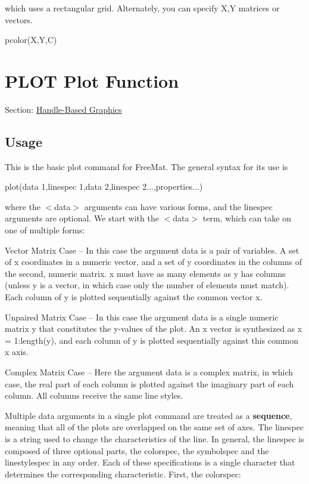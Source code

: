  which uses a rectangular grid. Alternately, you can specify {\ttfamily X,Y} matrices or vectors. \begin{DoxyVerb}   pcolor(X,Y,C)
\end{DoxyVerb}
 \hypertarget{handle_plot}{}\section{P\-L\-O\-T Plot Function}\label{handle_plot}
Section\-: \hyperlink{sec_handle}{Handle-\/\-Based Graphics} \hypertarget{vtkwidgets_vtkxyplotwidget_Usage}{}\subsection{Usage}\label{vtkwidgets_vtkxyplotwidget_Usage}
This is the basic plot command for Free\-Mat. The general syntax for its use is \begin{DoxyVerb}  plot(\<data 1\>,{linespec 1},\<data 2\>,{linespec 2}...,properties...)
\end{DoxyVerb}
 where the {\ttfamily $<$data$>$} arguments can have various forms, and the {\ttfamily linespec} arguments are optional. We start with the {\ttfamily $<$data$>$} term, which can take on one of multiple forms\-: 
\begin{DoxyItemize}
\item Vector Matrix Case -- In this case the argument data is a pair of variables. A set of {\ttfamily x} coordinates in a numeric vector, and a set of {\ttfamily y} coordinates in the columns of the second, numeric matrix. {\ttfamily x} must have as many elements as {\ttfamily y} has columns (unless {\ttfamily y} is a vector, in which case only the number of elements must match). Each column of {\ttfamily y} is plotted sequentially against the common vector {\ttfamily x}.  
\item Unpaired Matrix Case -- In this case the argument data is a single numeric matrix {\ttfamily y} that constitutes the {\ttfamily y}-\/values of the plot. An {\ttfamily x} vector is synthesized as {\ttfamily x = 1\-:length(y)}, and each column of {\ttfamily y} is plotted sequentially against this common {\ttfamily x} axis.  
\item Complex Matrix Case -- Here the argument data is a complex matrix, in which case, the real part of each column is plotted against the imaginary part of each column. All columns receive the same line styles.  
\end{DoxyItemize}Multiple data arguments in a single plot command are treated as a {\bfseries sequence}, meaning that all of the plots are overlapped on the same set of axes. The {\ttfamily linespec} is a string used to change the characteristics of the line. In general, the {\ttfamily linespec} is composed of three optional parts, the {\ttfamily colorspec}, the {\ttfamily symbolspec} and the {\ttfamily linestylespec} in any order. Each of these specifications is a single character that determines the corresponding characteristic. First, the {\ttfamily colorspec}\-: 
